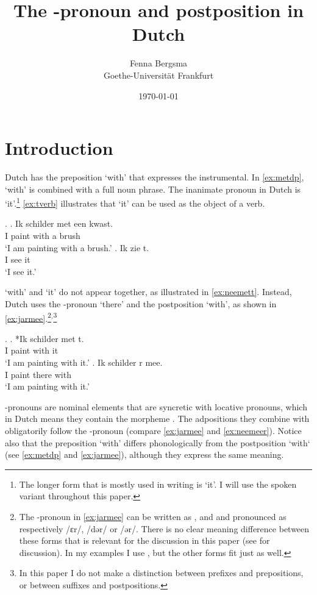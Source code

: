 \documentclass[11pt,a4paper]{article}
\title{The \tsc{r}-pronoun and postposition \tit{waar mee} in Dutch}
\author{Fenna Bergsma\\Goethe-Universität Frankfurt}
\date{\today}
\begin{document}
\maketitle


\section{Introduction}


Dutch has the preposition  `with' that expresses the instrumental. In \ref{ex:metdp},  `with' is combined with a full noun phrase. The inanimate pronoun in Dutch is  `it'.\footnote{The longer form that is mostly used in writing is  `it'. I will use the spoken variant  throughout this paper.} \ref{ex:tverb} illustrates that  `it' can be used as the object of a verb.

\ex.
\ag. Ik schilder met een kwast.\\
 I paint with a brush\\
 `I am painting with a brush.'\label{ex:metdp}
 \bg. Ik zie t.\\
  I see it\\
  `I see it.'\label{ex:tverb}

 `with' and  `it' do not appear together, as illustrated in \ref{ex:neemett}. Instead, Dutch uses the -pronoun  `there' and the postposition  `with', as shown in \ref{ex:jarmee}.\footnote{The -pronoun  in \ref{ex:jarmee} can be written as ,  and  and pronounced as respectively /ɛr/, /dər/ or /ər/. There is no clear meaning difference between these forms that is relevant for the discussion in this paper
(see \citealt{wesseling2018} for discussion).
In my examples I use , but the other forms fit just as well.}$^,$\footnote{In this paper I do not make a distinction between prefixes and prepositions, or between suffixes and postpositions.}

\ex.\label{ex:r meeconst}
\ag. *Ik schilder met t.\\
 I paint with it\\
 `I am painting with it.'\label{ex:neemett}
\bg. Ik schilder r mee.\\
 I paint there with\\
 `I am painting with it.'\label{ex:jarmee}

-pronouns are nominal elements that are syncretic with locative pronouns, which in Dutch means they contain the morpheme  \citep[cf.][]{riemsdijk1978,koopman1994}. The adpositions they combine with obligatorily follow the -pronoun (compare \ref{ex:jarmee} and \ref{ex:neemeer}).
Notice also that the preposition  `with' differs phonologically from the postposition  `with` (see \ref{ex:metdp} and \ref{ex:jarmee}), although they express the same meaning.
\end{document}
